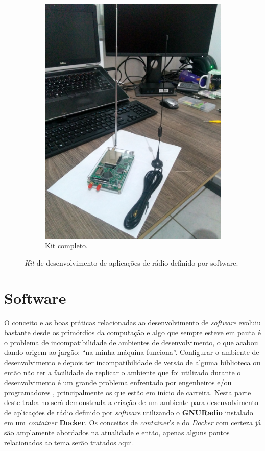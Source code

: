 \documentclass[
  12pt,				%
  openright,			%
  twoside,			%
  a4paper,			%
  english,			%
  french,				%
  spanish,			%
  brazil,				%
  ]{abntex2}
\begin{document}
\begin{figure}[!htb]
\begin{subfigure}[b]{0.45\linewidth}
    \includegraphics[width=\linewidth]{figures/hackrf/hack_rf_kit.jpg}
    \caption{Kit completo.}
    \label{fig:hack_rf_kit}
  \end{subfigure}
  \caption{\textit{Kit} de desenvolvimento de aplicações de rádio definido por software.}
  \label{fig:hack_rf_hdk}
\end{figure}

\chapter{Software}

O conceito e as boas práticas relacionadas ao desenvolvimento de \textit{software} evoluiu bastante desde os primórdios da computação e algo que sempre esteve
em pauta é o problema de incompatibilidade de ambientes de desenvolvimento, o que acabou dando origem ao jargão: “na minha máquina funciona”.
Configurar o ambiente de desenvolvimento e depois ter incompatibilidade de versão de alguma biblioteca ou então não ter a facilidade de replicar o ambiente
que foi utilizado durante o desenvolvimento é um grande problema enfrentado por engenheiros e/ou programadores \cite{meng2017facilitating}, principalmente os que estão em início de carreira.
Nesta parte deste trabalho será demonstrada a criação de um ambiente para desenvolvimento de aplicações de rádio definido por \textit{software} utilizando
o \textbf{GNURadio} instalado em um \textit{container} \textbf{Docker}.
Os conceitos de \textit{container}'s e do \textit{Docker} com certeza já são amplamente abordados na atualidade e então, apenas alguns pontos relacionados ao tema
serão tratados aqui.
\end{document}
